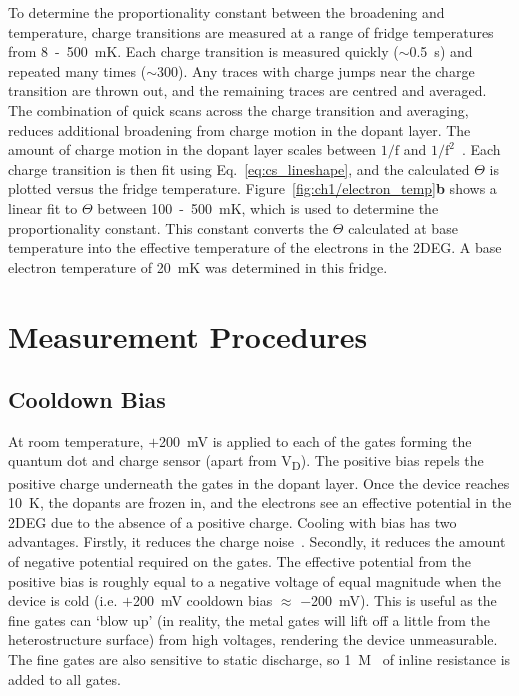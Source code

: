 To determine the proportionality constant between the broadening and temperature, charge transitions are measured at a range of fridge temperatures from \qty{8}{}~-~\qty{500}{mK}. Each charge transition is measured quickly ($\sim$\qty{0.5}{s}) and repeated many times ($\sim$\qty{300}{}). Any traces with charge jumps near the charge transition are thrown out, and the remaining traces are centred and averaged. The combination of quick scans across the charge transition and averaging, reduces additional broadening from charge motion in the dopant layer. The amount of charge motion in the dopant layer scales between $\mathrm{1/f}$ and $\mathrm{1/f^2}$~\cite{charge_noise}. Each charge transition is then fit using Eq.~\ref{eq:cs_lineshape}, and the calculated $\Theta$ is plotted versus the fridge temperature. Figure~\ref{fig:ch1/electron_temp}\textbf{b} shows a linear fit to $\Theta$ between \qty{100}{}~-~\qty{500}{mK}, which is used to determine the proportionality constant. This constant converts the $\Theta$ calculated at base temperature into the effective temperature of the electrons in the 2DEG. A base electron temperature of \qty{20}{mK} was determined in this fridge.



\afterpage{\clearpage}
\section{Measurement Procedures}

\subsection{Cooldown Bias}
At room temperature, $+$\qty{200}{mV} is applied to each of the gates forming the quantum dot and charge sensor (apart from V\textsubscript{D}). The positive bias repels the positive charge underneath the gates in the dopant layer. Once the device reaches \qty{10}{K}, the dopants are frozen in, and the electrons see an effective potential in the 2DEG due to the absence of a positive charge. Cooling with bias has two advantages. Firstly, it reduces the charge noise~\cite{bias_cooling}. Secondly, it reduces the amount of negative potential required on the gates. The effective potential from the positive bias is roughly equal to a negative voltage of equal magnitude when the device is cold (i.e. $+$\qty{200}{mV} cooldown bias $\approx$ $-$\qty{200}{mV}). This is useful as the fine gates can `blow up' (in reality, the metal gates will lift off a little from the heterostructure surface) from high voltages, rendering the device unmeasurable. The fine gates are also sensitive to static discharge, so \qty{1}{M\Omega} of inline resistance is added to all gates. 

